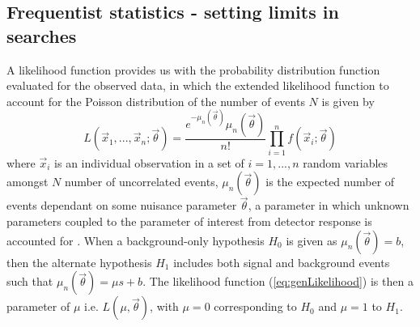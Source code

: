 \subsection{Frequentist statistics - setting limits in searches}
\label{sec:freqStat}
A likelihood function provides us with the probability distribution function evaluated for the observed data, in which the extended likelihood function to account for the Poisson distribution of the number of events $N$ is given by
\begin{equation}
    L(\vec{x}_1,...,\vec{x}_n; \vec{\theta}) 
    = \frac{e^{-\mu_n(\vec{\theta})}\mu_n(\vec{\theta})}{n!}\prod^n_{i=1} f(\vec{x}_i;\vec{\theta})
    \label{eq:genLikelihood}
\end{equation}
where $\vec{x}_i$ is an individual observation in a set of $i=1,...,n$ random variables amongst $N$ number of uncorrelated events, $\mu_n(\vec{\theta})$ is the expected number of events dependant on some nuisance parameter $\vec{\theta}$, a parameter in which unknown parameters coupled to the parameter of interest from detector response is accounted for \cite{lista2017statistical}. When a background-only hypothesis $H_0$ is given as $\mu_n(\vec{\theta})=b$, then the alternate hypothesis  $H_1$ includes both signal and background events such that $\mu_n(\vec{\theta})=\mu s+b$. The likelihood function (\ref{eq:genLikelihood}) is then a parameter of $\mu$ i.e. $L(\mu,\vec{\theta})$, with $\mu=0$ corresponding to $H_0$ and $\mu=1$ to $H_1$. \\

